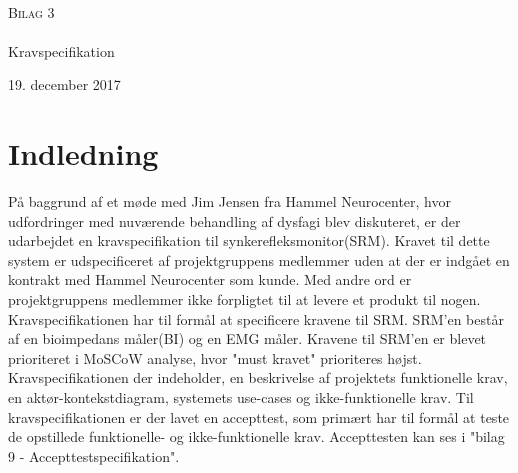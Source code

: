 

\begin{titlingpage}
\begin{center}

~ \\[3cm]


\textsc{\LARGE Bilag 3}\\[1.5cm]


\noindent\makebox[\linewidth]{\rule{\textwidth}{0.4pt}}\\
[0.5cm]{\Huge Kravspecifikation}
\noindent\makebox[\linewidth]{\rule{\textwidth}{0.4pt}}
\end{center}
\vfill
\begin{center}
{\large 19. december 2017}
\end{center}
\end{titlingpage}

\newpage
\tableofcontents*


\chapter{Indledning}
På baggrund af et møde med Jim Jensen fra Hammel Neurocenter, hvor udfordringer med nuværende behandling af dysfagi blev diskuteret, er der udarbejdet en kravspecifikation til synkerefleksmonitor(SRM). Kravet til dette system er udspecificeret af projektgruppens medlemmer uden at der er indgået en kontrakt med Hammel Neurocenter som kunde. Med andre ord er projektgruppens medlemmer ikke forpligtet til at levere et produkt til nogen. \\


Kravspecifikationen har til formål at specificere
kravene til SRM. SRM'en består af en bioimpedans måler(BI) og en EMG måler. Kravene til SRM'en er blevet prioriteret i MoSCoW analyse, hvor "must kravet" prioriteres højst. Kravspecifikationen  der indeholder, en beskrivelse af projektets funktionelle krav, en aktør-kontekstdiagram, systemets use-cases og ikke-funktionelle krav. Til  kravspecifikationen er der lavet en accepttest, som primært har til formål at teste
de opstillede funktionelle- og ikke-funktionelle krav. Accepttesten kan ses i "bilag 9 - Accepttestspecifikation".


